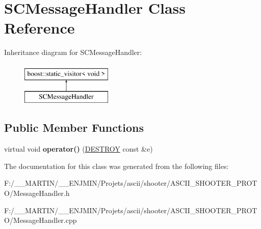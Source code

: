 \hypertarget{class_s_c_message_handler}{}\section{S\+C\+Message\+Handler Class Reference}
\label{class_s_c_message_handler}
Inheritance diagram for S\+C\+Message\+Handler\+:\begin{figure}[H]
\begin{center}
\leavevmode
\includegraphics[height=2.000000cm]{class_s_c_message_handler}
\end{center}
\end{figure}
\subsection*{Public Member Functions}
\begin{DoxyCompactItemize}
\item 
\hypertarget{class_s_c_message_handler_a8c8eb5ee23f04dbf644c5f4715d80b5e}{}\label{class_s_c_message_handler_a8c8eb5ee23f04dbf644c5f4715d80b5e} 
virtual void {\bfseries operator()} (\hyperlink{struct_d_e_s_t_r_o_y}{D\+E\+S\+T\+R\+OY} const \&e)
\end{DoxyCompactItemize}


The documentation for this class was generated from the following files\+:\begin{DoxyCompactItemize}
\item 
F\+:/\+\_\+\+\_\+\+M\+A\+R\+T\+I\+N/\+\_\+\+\_\+\+E\+N\+J\+M\+I\+N/\+Projets/ascii/shooter/\+A\+S\+C\+I\+I\+\_\+\+S\+H\+O\+O\+T\+E\+R\+\_\+\+P\+R\+O\+T\+O/Message\+Handler.\+h\item 
F\+:/\+\_\+\+\_\+\+M\+A\+R\+T\+I\+N/\+\_\+\+\_\+\+E\+N\+J\+M\+I\+N/\+Projets/ascii/shooter/\+A\+S\+C\+I\+I\+\_\+\+S\+H\+O\+O\+T\+E\+R\+\_\+\+P\+R\+O\+T\+O/Message\+Handler.\+cpp\end{DoxyCompactItemize}
